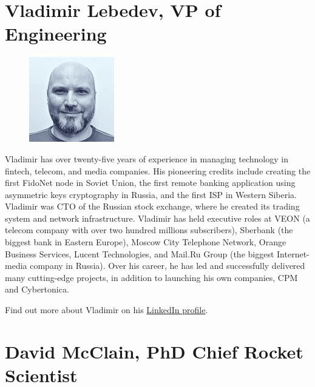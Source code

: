 \documentclass[8pt,fleqn,openany]{book}
\begin{document}
\section{Vladimir Lebedev, VP of Engineering}

{
\setlength\intextsep{0pt}
\begin{figure}
	\includegraphics{images/team/team-2.png}
\end{figure}

Vladimir has over twenty-five years of experience in managing technology in fintech, telecom, and media companies. His pioneering credits include creating the first FidoNet node in Soviet Union, the first remote banking application using asymmetric keys cryptography in Russia, and the first ISP in Western Siberia. Vladimir was CTO of the Russian stock exchange, where he created its trading system and network infrastructure. Vladimir has held executive roles at VEON (a telecom company with over two hundred millions subscribers), Sberbank (the biggest bank in Eastern Europe), Moscow City Telephone Network, Orange Business Services, Lucent Technologies, and Mail.Ru Group (the biggest Internet-media company in Russia). Over his career, he has led and successfully delivered many cutting-edge projects, in addition to launching his own companies, CPM and Cybertonica. 

Find out more about Vladimir on his \href{https://linkedin.com/in/vlebedev}{LinkedIn profile}.
}

\section{David McClain, PhD Chief Rocket Scientist}
\end{document}
